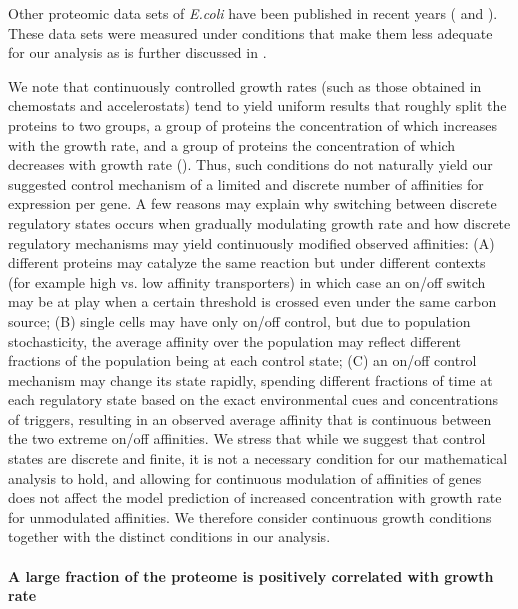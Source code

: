 \documentclass[10pt,letterpaper]{article}
\begin{document}
Other proteomic data sets of \emph{E.coli} have been published in recent years (\cite{Valgepea2013} and \cite{Hui_2015}).
These data sets were measured under conditions that make them less adequate for our analysis as is further discussed in .

We note that continuously controlled growth rates (such as those obtained in chemostats and accelerostats) tend to yield uniform results that roughly split the proteins to two groups, a group of proteins the concentration of which increases with the growth rate, and a group of proteins the concentration of which decreases with growth rate ().
Thus, such conditions do not naturally yield our suggested control mechanism of a limited and discrete number of affinities for expression per gene.
A few reasons may explain why switching between discrete regulatory states occurs when gradually modulating growth rate and how discrete regulatory mechanisms may yield continuously modified observed affinities: 
(A) different proteins may catalyze the same reaction but under different contexts (for example high vs. low affinity transporters) in which case an on/off switch may be at play when a certain threshold is crossed even under the same carbon source; 
(B) single cells may have only on/off control, but due to population stochasticity, the average affinity over the population may reflect different fractions of the population being at each control state; 
(C) an on/off control mechanism may change its state rapidly, spending different fractions of time at each regulatory state based on the exact environmental cues and concentrations of triggers, resulting in an observed average affinity that is continuous between the two extreme on/off affinities.
We stress that while we suggest that control states are discrete and finite, it is not a necessary condition for our mathematical analysis to hold, and allowing for continuous modulation of affinities of genes does not affect the model prediction of increased concentration with growth rate for unmodulated affinities.
We therefore consider continuous growth conditions together with the distinct conditions in our analysis.

\paragraph{A large fraction of the proteome is positively correlated with growth rate}
\end{document}

